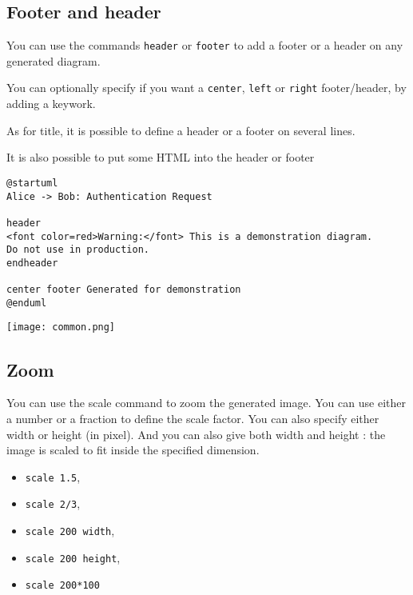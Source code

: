 \subsection{Footer and header} 

\begin{description}
\item You can use the commands \texttt{header} or \texttt{footer} to add a
footer or a header on any generated diagram. 
\item You can optionally specify if you want a \texttt{center}, \texttt{left} or
\texttt{right} footer/header, by adding a keywork. 
\item As for title, it is possible to define a header or a footer on several lines. 
\item It is also possible to put some HTML into the header or footer 
\end{description}


\begin{lstlisting}
@startuml
Alice -> Bob: Authentication Request 

header 
<font color=red>Warning:</font> This is a demonstration diagram.
Do not use in production.
endheader 

center footer Generated for demonstration 
@enduml 
\end{lstlisting}

\begin{center}
\texttt{[image: common.png]}
\end{center}

\newpage \subsection{Zoom}

You can use the scale command to zoom the generated image.
You can use either a number or a fraction to define the scale factor.
You can also specify either width or height (in pixel).
And you can also give both width and height : the image is scaled to fit inside the specified dimension.

\begin{itemize}
\item \texttt{scale 1.5}, 
\item \texttt{scale 2/3}, 
\item \texttt{scale 200 width}, 
\item \texttt{scale 200 height}, 
\item \texttt{scale 200*100} 
\end{itemize}


